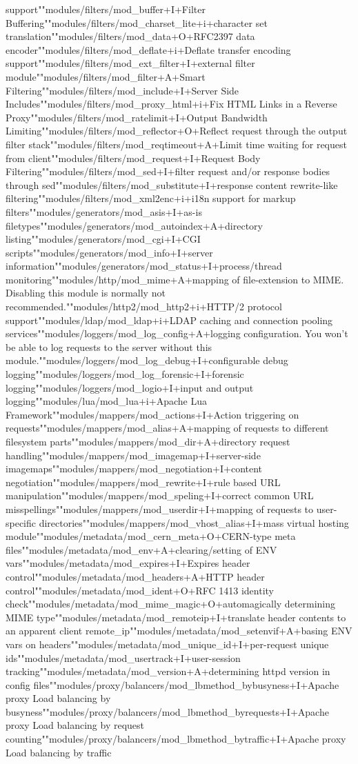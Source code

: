 support""modules/filters/mod_buffer+I+Filter Buffering""modules/filters/mod_charset_lite+i+character set translation""modules/filters/mod_data+O+RFC2397 data encoder""modules/filters/mod_deflate+i+Deflate transfer encoding support""modules/filters/mod_ext_filter+I+external filter module""modules/filters/mod_filter+A+Smart Filtering""modules/filters/mod_include+I+Server Side Includes""modules/filters/mod_proxy_html+i+Fix HTML Links in a Reverse Proxy""modules/filters/mod_ratelimit+I+Output Bandwidth Limiting""modules/filters/mod_reflector+O+Reflect request through the output filter stack""modules/filters/mod_reqtimeout+A+Limit time waiting for request from client""modules/filters/mod_request+I+Request Body Filtering""modules/filters/mod_sed+I+filter request and/or response bodies through sed""modules/filters/mod_substitute+I+response content rewrite-like filtering""modules/filters/mod_xml2enc+i+i18n support for markup filters""modules/generators/mod_asis+I+as-is filetypes""modules/generators/mod_autoindex+A+directory listing""modules/generators/mod_cgi+I+CGI scripts""modules/generators/mod_info+I+server information""modules/generators/mod_status+I+process/thread monitoring""modules/http/mod_mime+A+mapping of file-extension to MIME.  Disabling this module is normally not recommended.""modules/http2/mod_http2+i+HTTP/2 protocol support""modules/ldap/mod_ldap+i+LDAP caching and connection pooling services""modules/loggers/mod_log_config+A+logging configuration.  You won't be able to log requests to the server without this module.""modules/loggers/mod_log_debug+I+configurable debug logging""modules/loggers/mod_log_forensic+I+forensic logging""modules/loggers/mod_logio+I+input and output logging""modules/lua/mod_lua+i+Apache Lua Framework""modules/mappers/mod_actions+I+Action triggering on requests""modules/mappers/mod_alias+A+mapping of requests to different filesystem parts""modules/mappers/mod_dir+A+directory request handling""modules/mappers/mod_imagemap+I+server-side imagemaps""modules/mappers/mod_negotiation+I+content negotiation""modules/mappers/mod_rewrite+I+rule based URL manipulation""modules/mappers/mod_speling+I+correct common URL misspellings""modules/mappers/mod_userdir+I+mapping of requests to user-specific directories""modules/mappers/mod_vhost_alias+I+mass virtual hosting module""modules/metadata/mod_cern_meta+O+CERN-type meta files""modules/metadata/mod_env+A+clearing/setting of ENV vars""modules/metadata/mod_expires+I+Expires header control""modules/metadata/mod_headers+A+HTTP header control""modules/metadata/mod_ident+O+RFC 1413 identity check""modules/metadata/mod_mime_magic+O+automagically determining MIME type""modules/metadata/mod_remoteip+I+translate header contents to an apparent client remote_ip""modules/metadata/mod_setenvif+A+basing ENV vars on headers""modules/metadata/mod_unique_id+I+per-request unique ids""modules/metadata/mod_usertrack+I+user-session tracking""modules/metadata/mod_version+A+determining httpd version in config files""modules/proxy/balancers/mod_lbmethod_bybusyness+I+Apache proxy Load balancing by busyness""modules/proxy/balancers/mod_lbmethod_byrequests+I+Apache proxy Load balancing by request counting""modules/proxy/balancers/mod_lbmethod_bytraffic+I+Apache proxy Load balancing by traffic 